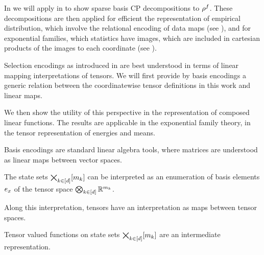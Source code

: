 In  we will apply  in  to show sparse basis CP decompositions to $\rho^{f}$.
These decompositions are then applied for efficient the representation of empirical distribution, which involve the relational encoding of data maps (see ), and for exponential families, which statistics have images, which are included in cartesian products of the images to each coordinate (see ).




Selection encodings as introduced in  are best understood in terms of linear mapping interpretations of tensors.
We will first provide by basis encodings a generic relation between the coordinatewise tensor definitions in this work and linear maps.

We then show the utility of this perspective in the representation of composed linear functions.
The results are applicable in the exponential family theory, in the tensor representation of energies and means.


Basis encodings are standard linear algebra tools, where matrices are understood as linear maps between vector spaces.

The state sets $\bigtimes_{k\in[d]}[m_{k}]$ can be interpreted as an enumeration of basis elements $e_{x}$ of the tensor space $\bigotimes_{k\in[d]} \mathbb{R}^{m_{k}}$.

Along this interpretation, tensors have an interpretation as maps between tensor spaces.


Tensor valued functions on state sets $\bigtimes_{k\in[d]}[m_{k}]$ are an intermediate representation.

